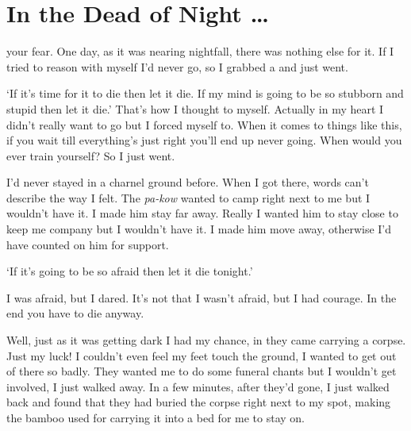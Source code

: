 
\chapter{In the Dead of Night \ldots}

 your fear. One day, as it was nearing nightfall, there was nothing else for it. If I tried to reason with myself I'd never go, so I grabbed a \textit{} and just went. 

`If it's time for it to die then let it die. If my mind is going to be so stubborn and stupid then let it die.' That's how I thought to myself. Actually in my heart I didn't really want to go but I forced myself to. When it comes to things like this, if you wait till everything's just right you'll end up never going. When would you ever train yourself? So I just went. 

I'd never stayed in a charnel ground before. When I got there, words can't describe the way I felt. The \textit{pa-kow} wanted to camp right next to me but I wouldn't have it. I made him stay far away. Really I wanted him to stay close to keep me company but I wouldn't have it. I made him move away, otherwise I'd have counted on him for support. 

`If it's going to be so afraid then let it die tonight.' 

I was afraid, but I dared. It's not that I wasn't afraid, but I had courage. In the end you have to die anyway. 

Well, just as it was getting dark I had my chance, in they came carrying a corpse. Just my luck! I couldn't even feel my feet touch the ground, I wanted to get out of there so badly. They wanted me to do some funeral chants but I wouldn't get involved, I just walked away. In a few minutes, after they'd gone, I just walked back and found that they had buried the corpse right next to my spot, making the bamboo used for carrying it into a bed for me to stay on. 

